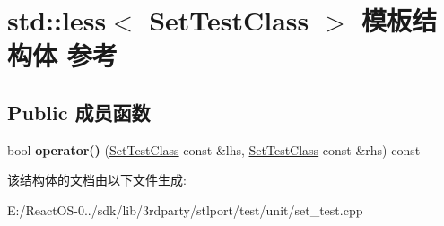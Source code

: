 \hypertarget{structstd_1_1less_3_01_set_test_class_01_4}{}\section{std\+:\+:less$<$ Set\+Test\+Class $>$ 模板结构体 参考}
\label{structstd_1_1less_3_01_set_test_class_01_4}
\subsection*{Public 成员函数}
\begin{DoxyCompactItemize}
\item 
\mbox{\label{structstd_1_1less_3_01_set_test_class_01_4_a34a2385376272fb3508d61cb788e31ad}} 
bool {\bfseries operator()} (\hyperlink{class_set_test_class}{Set\+Test\+Class} const \&lhs, \hyperlink{class_set_test_class}{Set\+Test\+Class} const \&rhs) const
\end{DoxyCompactItemize}


该结构体的文档由以下文件生成\+:\begin{DoxyCompactItemize}
\item 
E\+:/\+React\+O\+S-\/0../sdk/lib/3rdparty/stlport/test/unit/set\+\_\+test.\+cpp\end{DoxyCompactItemize}
